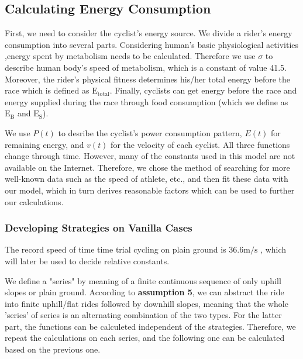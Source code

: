 \documentclass[12pt]{article}
\theoremstyle{definition}
\theoremstyle{remark}
\numberwithin{equation}{section}
\begin{document}
	\subsection{Calculating Energy Consumption}
	First, we need to consider the cyclist's energy source. We divide a rider's energy consumption into several parts. Considering human's basic physiological activities ,energy spent by metabolism needs to be calculated. Therefore we use $\sigma$ to describe human body's speed of metabolism, which is a constant of value 41.5. Moreover, the rider's physical fitness determines his/her total energy before the race which is defined as $\mathrm{E}_\mathrm{total}$. Finally, cyclists can get energy before the race and energy supplied during the race through food consumption (which we define as $\mathrm{E}_\mathrm{B}$ and $\mathrm{E}_\mathrm{S}$).

	We use $P(t)$ to desribe the cyclist's power consumption pattern, $E(t)$ for remaining energy, and $v(t)$ for the velocity of each cyclist. All three functions change through time. However, many of the constants used in this model are not available on the Internet. Therefore, we chose the method of searching for more well-known data such as the speed of athlete, etc., and then fit these data with our model, which in turn derives reasonable factors which can be used to further our calculations.

	\subsubsection{Developing Strategies on Vanilla Cases}
	The record speed of time time trial cycling on plain ground is 36.6$\mathrm{m/s}$ \cite{time trial record}, which will later be used to decide relative constants.

	We define a "series" by meaning of a finite continuous sequence of only uphill slopes or plain ground. According to \textbf{assumption 5}, we can abstract the ride into finite uphill/flat rides followed by downhill slopes, meaning that the whole 'series' of series is an alternating combination of the two types. For the latter part, the functions can be calculeted independent of the strategies. Therefore, we repeat the calculations on each series, and the following one can be calculated based on the previous one.
\end{document}
